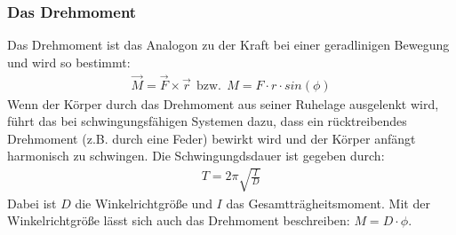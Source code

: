 \subsubsection{Das Drehmoment}
Das Drehmoment ist das Analogon zu der Kraft bei einer geradlinigen Bewegung und wird so bestimmt:
\begin{align}
    \vec{M} = \vec{F} \times \vec{r} \:\: \mathrm{bzw.} \:\: M = F \cdot r \cdot sin(\phi)
\end{align}
Wenn der Körper durch das Drehmoment aus seiner Ruhelage ausgelenkt wird, führt das bei schwingungsfähigen Systemen dazu,
dass ein rücktreibendes Drehmoment (z.B. durch eine Feder) bewirkt wird und der Körper anfängt harmonisch zu schwingen. Die Schwingungdsdauer
ist gegeben durch:
\begin{align}
    T = 2\pi \sqrt{\frac{I}{D}}
\end{align}
Dabei ist $D$ die Winkelrichtgröße und $I$ das Gesamtträgheitsmoment. Mit der Winkelrichtgröße lässt sich auch das Drehmoment beschreiben: $M = D \cdot \phi$.

\cite{sample}
\newpage
